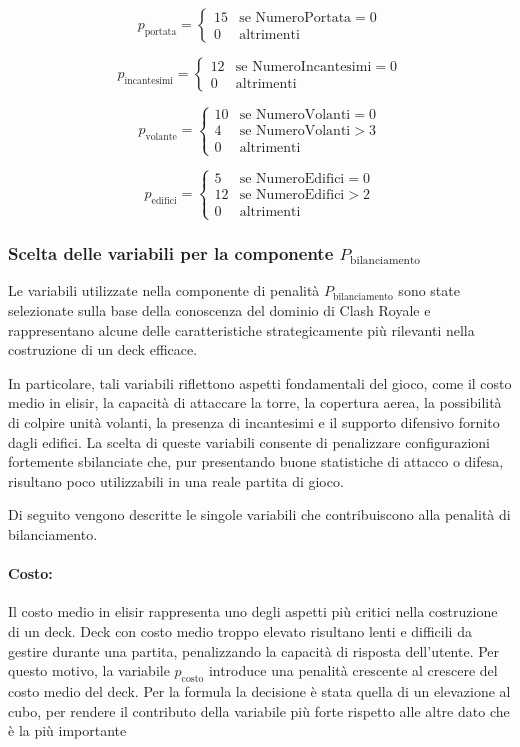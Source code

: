 \documentclass{article}
\begin{document}
\[
p_{\text{portata}} =
\begin{cases}
15 & \text{se } \text{NumeroPortata} = 0 \\
0 & \text{altrimenti}
\end{cases}
\]

\[
p_{\text{incantesimi}} =
\begin{cases}
12 & \text{se } \text{NumeroIncantesimi} = 0 \\
0 & \text{altrimenti}
\end{cases}
\]

\[
p_{\text{volante}} =
\begin{cases}
10 & \text{se } \text{NumeroVolanti} = 0 \\
4 & \text{se } \text{NumeroVolanti} > 3 \\
0 & \text{altrimenti}
\end{cases}
\]

\[
p_{\text{edifici}} =
\begin{cases}
5 & \text{se } \text{NumeroEdifici} = 0 \\
12 & \text{se } \text{NumeroEdifici} > 2 \\
0 & \text{altrimenti}
\end{cases}
\]

\subsubsection{Scelta delle variabili per la componente $P_{\text{bilanciamento}}$}

Le variabili utilizzate nella componente di penalità $P_{\text{bilanciamento}}$ sono state selezionate sulla base della conoscenza del dominio di Clash Royale e rappresentano alcune delle caratteristiche strategicamente più rilevanti nella costruzione di un deck efficace.

In particolare, tali variabili riflettono aspetti fondamentali del gioco, come il costo medio in elisir, la capacità di attaccare la torre, la copertura aerea, la possibilità di colpire unità volanti, la presenza di incantesimi e il supporto difensivo fornito dagli edifici. 
La scelta di queste variabili consente di penalizzare configurazioni fortemente sbilanciate che, pur presentando buone statistiche di attacco o difesa, risultano poco utilizzabili in una reale partita di gioco.

Di seguito vengono descritte le singole variabili che contribuiscono alla penalità di bilanciamento.

\paragraph{Costo:}
Il costo medio in elisir rappresenta uno degli aspetti più critici nella costruzione di un deck. 
Deck con costo medio troppo elevato risultano lenti e difficili da gestire durante una partita, penalizzando la capacità di risposta dell’utente. 
Per questo motivo, la variabile $p_{\text{costo}}$ introduce una penalità crescente al crescere del costo medio del deck.
Per la formula la decisione è stata quella di un elevazione al cubo, per rendere il contributo della variabile più forte rispetto alle altre dato che è la più importante 
\end{document}
